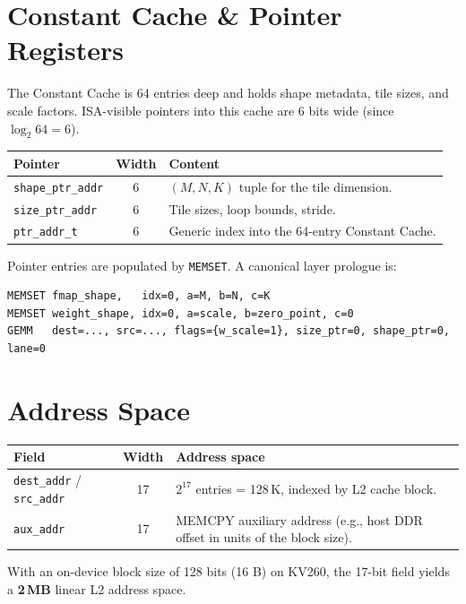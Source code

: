 \documentclass[11pt,a4paper,twoside,openany]{report}
\begin{document}
\section{Constant Cache \& Pointer Registers}

The Constant Cache is 64 entries deep and holds shape metadata, tile
sizes, and scale factors. ISA-visible pointers into this cache are
6 bits wide (since $\log_2 64 = 6$).

\begin{longtable}{|l|c|p{8cm}|}
\hline
\rowcolor{skytint}
\textbf{Pointer} & \textbf{Width} & \textbf{Content} \\
\hline
\endfirsthead
\texttt{shape\_ptr\_addr}  & 6 & $(M, N, K)$ tuple for the tile dimension. \\
\hline
\texttt{size\_ptr\_addr}   & 6 & Tile sizes, loop bounds, stride. \\
\hline
\texttt{ptr\_addr\_t}      & 6 & Generic index into the 64-entry Constant Cache. \\
\hline
\end{longtable}

Pointer entries are populated by \texttt{MEMSET}. A canonical layer
prologue is:

\begin{lstlisting}[style=pseudo]
MEMSET fmap_shape,   idx=0, a=M, b=N, c=K
MEMSET weight_shape, idx=0, a=scale, b=zero_point, c=0
GEMM   dest=..., src=..., flags={w_scale=1}, size_ptr=0, shape_ptr=0, lane=0
\end{lstlisting}

\section{Address Space}

\begin{longtable}{|l|c|p{9cm}|}
\hline
\rowcolor{skytint}
\textbf{Field} & \textbf{Width} & \textbf{Address space} \\
\hline
\endfirsthead
\texttt{dest\_addr} / \texttt{src\_addr} & 17 & $2^{17}$ entries = 128\,K, indexed by L2 cache block. \\
\hline
\texttt{aux\_addr}                       & 17 & MEMCPY auxiliary address (e.g., host DDR offset in units of the block size). \\
\hline
\end{longtable}

With an on-device block size of 128 bits (16 B) on KV260, the 17-bit
field yields a \textbf{2\,MB} linear L2 address space.
\end{document}
